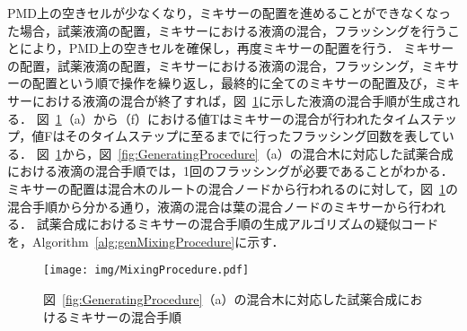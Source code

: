 \newpage
PMD上の空きセルが少なくなり，ミキサーの配置を進めることができなくなった場合，試薬液滴の配置，ミキサーにおける液滴の混合，フラッシングを行うことにより，PMD上の空きセルを確保し，再度ミキサーの配置を行う．
ミキサーの配置，試薬液滴の配置，ミキサーにおける液滴の混合，フラッシング，ミキサーの配置という順で操作を繰り返し，最終的に全てのミキサーの配置及び，ミキサーにおける液滴の混合が終了すれば，図~\ref{fig:MixingProcedure}に示した液滴の混合手順が生成される．
図~\ref{fig:MixingProcedure}（a）から（f）における値Tはミキサーの混合が行われたタイムステップ，値Fはそのタイムステップに至るまでに行ったフラッシング回数を表している．
図~\ref{fig:MixingProcedure}から，図~\ref{fig:GeneratingProcedure}（a）の混合木に対応した試薬合成における液滴の混合手順では，1回のフラッシングが必要であることがわかる．
ミキサーの配置は混合木のルートの混合ノードから行われるのに対して，図~\ref{fig:MixingProcedure}の混合手順から分かる通り，液滴の混合は葉の混合ノードのミキサーから行われる．
試薬合成におけるミキサーの混合手順の生成アルゴリズムの疑似コードを，Algorithm~\ref{alg:genMixingProcedure}に示す．

\begin{figure}[tbp]
    \centering\texttt{[image: img/MixingProcedure.pdf]}
    \caption{図~\ref{fig:GeneratingProcedure}（a）の混合木に対応した試薬合成におけるミキサーの混合手順}
    \label{fig:MixingProcedure}
\end{figure}

